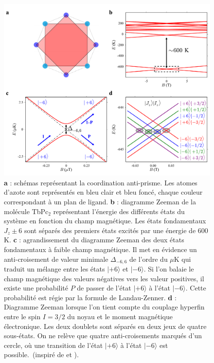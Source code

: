 \begin{figure}
\centering \includegraphics[scale=0.45]{Resultats/TbPc2Mag/TbPc2Mag.pdf} 
\caption{\textbf{a} : schémas représentant la coordination anti-prisme. Les atomes d'azote sont représentés en bleu clair et bleu foncé, chaque couleur correspondant à un plan de ligand. \textbf{b} : diagramme Zeeman de la molécule TbPc$_2$ représentant l'énergie des différents états du système en fonction du champ magnétique. Les états fondamentaux $J_z \pm 6$ sont séparés des premiers états excités par une énergie de $600$\,K. \textbf{c} : agrandissement du diagramme Zeeman des deux états fondamentaux à faible champ magnétique. Il met en évidence un anti-croisement de valeur minimale $\Delta_{-6,6}$ de l'ordre du $\mu$K qui traduit un mélange entre les états $|+6\rangle$ et $|-6\rangle$. Si l'on balaie le champ magnétique des valeurs négatives vers les valeur positives, il existe une probabilité $P$ de passer de l'état $|+6\rangle$ à l'état $|-6\rangle$. Cette probabilité est régie par la formule de Landau-Zenner. \textbf{d} : Diagramme Zeeman lorsque l'on tient compte du couplage hyperfin entre le spin $I=3/2$ du noyau et le moment magnétique électronique. Les deux doublets sont séparés en deux jeux de quatre sous-états. On ne relève que quatre anti-croisements marqués d'un cercle, où une transition de l'état  $|+6\rangle$ à l'état $|-6\rangle$ est possible.~(inspiré de \cite{Ishikawa2005} et \cite{Sorace2011}).}
\label{TbPc2Zeeman}
\end{figure}


